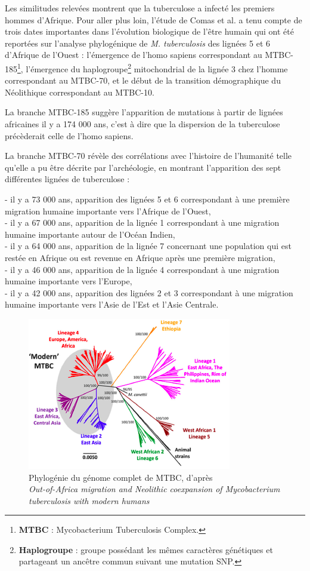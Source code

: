 \documentclass[twoside,a4paper,11pt,frenchb,openany]{report}
\begin{document}
Les similitudes relevées montrent que la tuberculose a infecté les premiers hommes d'Afrique. Pour aller plus loin, l'étude de Comas et al. a tenu compte de trois dates importantes dans l'évolution biologique de l'être humain qui ont été reportées sur l'analyse phylogénique de \textit{M. tuberculosis} des lignées 5 et 6 d'Afrique de l'Ouest : l'émergence de l'homo sapiens correspondant au MTBC-185\footnote{\textbf{MTBC} : Mycobacterium Tuberculosis Complex.}, l'émergence du haplogroupe\footnote{\textbf{Haplogroupe} : groupe possédant les mêmes caractères génétiques et partageant un ancêtre commun suivant une mutation SNP.} mitochondrial de la lignée 3 chez l'homme correspondant au MTBC-70, et le début de la transition démographique du Néolithique correspondant au MTBC-10.

La branche MTBC-185 suggère l'apparition de mutations à partir de lignées africaines il y a 174 000 ans, c'est à dire que la dispersion de la tuberculose précèderait celle de l'homo sapiens.

La branche MTBC-70 révèle des corrélations avec l'histoire de l'humanité telle qu'elle a pu être décrite par l'archéologie, en montrant l'apparition des sept différentes lignées de tuberculose :

- il y a 73 000 ans, apparition des lignées 5 et 6 correspondant à une première migration humaine importante vers l'Afrique de l'Ouest,\\
- il y a 67 000 ans, apparition de la lignée 1 correspondant à une migration humaine importante autour de l'Océan Indien,\\
- il y a 64 000 ans, apparition de la lignée 7 concernant une population qui est restée en Afrique ou est revenue en Afrique après une première migration,\\
- il y a 46 000 ans, apparition de la lignée 4 correspondant à une migration humaine importante vers l'Europe,\\
- il y a 42 000 ans, apparition des lignées 2 et 3 correspondant à une migration humaine importante vers l'Asie de l'Est et l'Asie Centrale. 

\begin{figure}[h!]
\centering
\includegraphics[scale=0.7]{worldlignee.png}
\caption{Phylogénie du génome complet de MTBC, d'après\\ \textit{Out-of-Africa migration and Neolithic coexpansion of Mycobacterium\\tuberculosis with modern humans}}
\end{figure}
\end{document}
